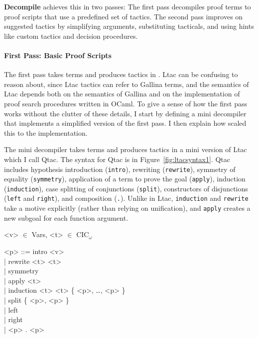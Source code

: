 \textbf{Decompile} achieves this in two passes: The first pass decompiles proof terms to proof scripts that use a predefined set of tactics.
The second pass improves on suggested tactics by simplifying arguments, substituting tacticals, and using
hints like custom tactics and decision procedures. %

\paragraph{First Pass: Basic Proof Scripts}
The first pass takes  terms and produces tactics in . %
Ltac can be confusing to reason about, since Ltac tactics can refer to Gallina terms, and the semantics of Ltac depends both on the
semantics of Gallina and on the implementation of proof search procedures written in OCaml.
To give a sense of how the first pass works without the clutter of these details, I start by defining a mini decompiler that 
implements a simplified version of the first pass.
I then explain how  scaled this to the implementation.

The mini decompiler takes  terms and produces tactics in a 
mini version of Ltac which I call Qtac.
The syntax for Qtac is in Figure~\ref{fig:ltacsyntax1}.
Qtac includes hypothesis introduction (\lstinline{intro}),
rewriting (\lstinline{rewrite}), symmetry of equality (\lstinline{symmetry}),
application of a term to prove the goal (\lstinline{apply}), induction (\lstinline{induction}),
case splitting of conjunctions (\lstinline{split}),
constructors of disjunctions (\lstinline{left} and \lstinline{right}), and
composition (\lstinline{.}).
Unlike in Ltac, \lstinline{induction} and \lstinline{rewrite} take a motive explicitly (rather than relying on unification),
and \lstinline{apply} creates a new subgoal for each function argument.


\begin{figure*}
\small
\begin{grammar}
<v> $\in$ Vars, <t> $\in$ CIC$_{\omega}$

<p> ::= intro <v> \\ | rewrite <t> <t> \\  |  symmetry \\  |  apply <t> \\  |  induction <t> <t> \{ <p>, \ldots, <p> \} \\  |  split \{ <p>, <p> \} \\ |  left \\  |  right \\  |  <p> . <p>
\end{grammar}
\vspace{-0.5cm}
\caption{Qtac syntax.}
\label{fig:ltacsyntax1}
\end{figure*}

